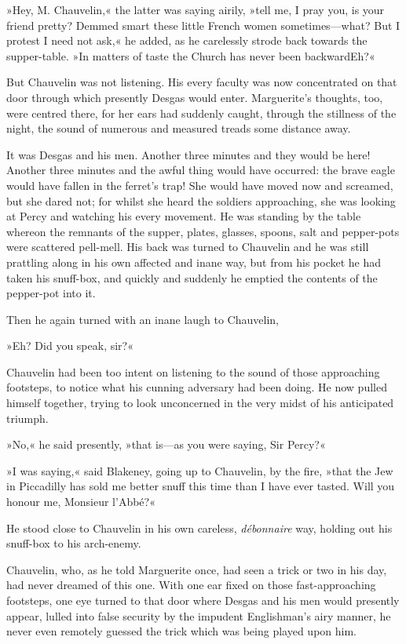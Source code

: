 »Hey, M. Chauvelin,« the latter was saying airily, »tell me, I pray you, is your friend pretty? Demmed smart these little French women sometimes—what? But I protest I need not ask,« he added, as he carelessly strode back towards the supper-table. »In matters of taste the Church has never been backward\textellipsis \allowbreak  Eh?«

But Chauvelin was not listening. His every faculty was now concentrated on that door through which presently Desgas would enter. Marguerite's thoughts, too, were centred there, for her ears had suddenly caught, through the stillness of the night, the sound of numerous and measured treads some distance away.

It was Desgas and his men. Another three minutes and they would be here! Another three minutes and the awful thing would have occurred: the brave eagle would have fallen in the ferret's trap! She would have moved now and screamed, but she dared not; for whilst she heard the soldiers approaching, she was looking at Percy and watching his every movement. He was standing by the table whereon the remnants of the supper, plates, glasses, spoons, salt and pepper-pots were scattered pell-mell. His back was turned to Chauvelin and he was still prattling along in his own affected and inane way, but from his pocket he had taken his snuff-box, and quickly and suddenly he emptied the contents of the pepper-pot into it.

Then he again turned with an inane laugh to Chauvelin,\longdash


»Eh? Did you speak, sir?«

Chauvelin had been too intent on listening to the sound of those approaching footsteps, to notice what his cunning adversary had been doing. He now pulled himself together, trying to look unconcerned in the very midst of his anticipated triumph.

»No,« he said presently, »that is—as you were saying, Sir Percy\longdash ?«

»I was saying,« said Blakeney, going up to Chauvelin, by the fire, »that the Jew in Piccadilly has sold me better snuff this time than I have ever tasted. Will you honour me, Monsieur l'Abbé?«

He stood close to Chauvelin in his own careless, \textit{débonnaire} way, holding out his snuff-box to his arch-enemy.

Chauvelin, who, as he told Marguerite once, had seen a trick or two in his day, had never dreamed of this one. With one ear fixed on those fast-approaching footsteps, one eye turned to that door where Desgas and his men would presently appear, lulled into false security by the impudent Englishman's airy manner, he never even remotely guessed the trick which was being played upon him.

